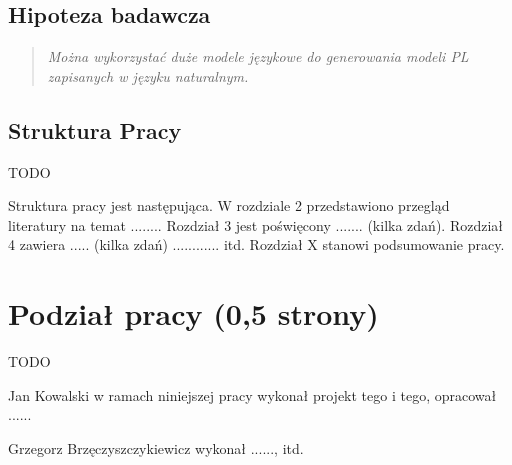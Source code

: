 \subsection{Hipoteza badawcza} 
\begin{quote}
\textit{Można wykorzystać duże modele językowe do generowania modeli PL zapisanych w języku naturalnym.}
\end{quote}

\subsection{Struktura Pracy}
TODO

Struktura pracy jest następująca. W rozdziale 2 przedstawiono przegląd literatury na temat ........ 
Rozdział 3 jest poświęcony ....... (kilka zdań). 
Rozdział 4 zawiera ..... (kilka zdań) ............ itd. 
Rozdział X stanowi podsumowanie pracy. 


\section{Podział pracy (0,5 strony)}
TODO

Jan Kowalski w ramach niniejszej pracy wykonał projekt tego i tego, opracował ......

Grzegorz Brzęczyszczykiewicz wykonał ......, itd. 

